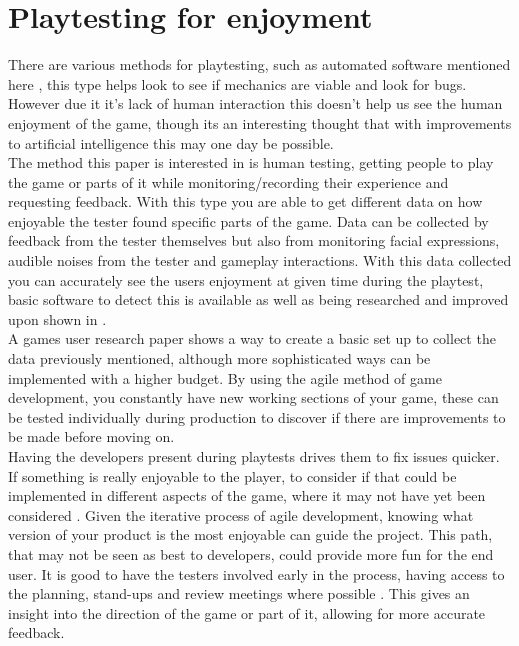 \documentclass{scrartcl}
\begin{document}
	\section{Playtesting for enjoyment}
	There are various methods for playtesting, such as automated software mentioned here \cite{powley2016semi}, this type helps look to see if mechanics are viable and look for bugs. However due it it's lack of human interaction this doesn't help us see the human enjoyment of the game, though its an interesting thought that with improvements to artificial intelligence this may one day be possible.\\ The method this paper is interested in is human testing, getting people to play the game or parts of it while monitoring/recording their experience and requesting feedback. With this type you are able to get different data on how enjoyable the tester found specific parts of the game. Data can be collected by feedback from the tester themselves but also from monitoring facial expressions, audible noises from the tester and gameplay interactions. With this data collected you can accurately see the users enjoyment at given time during the playtest, basic software to detect this is available as well as being researched and improved upon shown in \cite{de1997facial}.\\ A games user research \cite{moosajee2016games} paper shows a way to create a basic set up to collect the data previously mentioned, although more sophisticated ways can be implemented with a higher budget. By using the agile method of game development, you constantly have new working sections of your game, these can be tested individually during production to discover if there are improvements to be made before moving on.\\ Having the developers present during playtests drives them to fix issues quicker. If something is really enjoyable to the player, to consider if that could be implemented in different aspects of the game, where it may not have yet been considered \cite{moosajee2016games}. Given the iterative process of agile development, knowing what version of your product is the most enjoyable can guide the project. This path, that may not be seen as best to developers, could provide more fun for the end user. It is good to have the testers involved early in the process, having access to the planning, stand-ups and review meetings where possible \cite{cruzes2016communication}. This gives an insight into the direction of the game or part of it, allowing for more accurate feedback.
	
\end{document}
